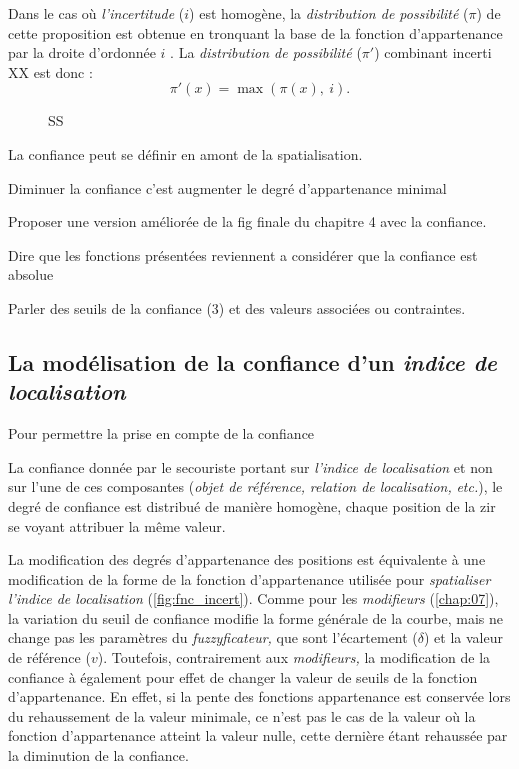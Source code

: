 Dans le cas où \emph{l'incertitude} (\(i\)) est homogène, la
\emph{distribution de possibilité} (\(π\)) de cette proposition est
obtenue en tronquant la base de la fonction d'appartenance par la
droite d'ordonnée \(i\) \autocite{Bouchon-Meunier2007}. La
\emph{distribution de possibilité} (\(π'\)) combinant incerti XX est
donc :
%
\begin{equation}
  π'(x) = \max(π(x),\ i).  
\end{equation}


\begin{figure}
  \centering
  
  \caption{SS}
  \label{fig:ss}
\end{figure}


La confiance peut se définir en amont de la spatialisation.

Diminuer la confiance c'est augmenter le degré d'appartenance minimal

Proposer une version améliorée de la fig finale du chapitre 4 avec la
confiance.

Dire que les fonctions présentées reviennent a considérer que la
confiance est absolue

Parler des seuils de la confiance (3) et des valeurs associées ou
contraintes.


\subsection{La modélisation de la confiance d'un \emph{indice de
    localisation}}

Pour permettre la prise en compte de la confiance


La confiance donnée par le secouriste portant sur \emph{l'indice de
  localisation} et non sur l'une de ces composantes (\eg \emph{objet
  de référence,} \emph{relation de localisation,} \emph{etc.}), le
degré de confiance est distribué de manière homogène, chaque position
de la \ac{zir} se voyant attribuer la même valeur.


La modification des degrés d'appartenance des positions est
équivalente à une modification de la forme de la fonction
d'appartenance utilisée pour \emph{spatialiser l'indice de
  localisation} (\autoref{fig:fnc_incert}). Comme pour les
\emph{modifieurs} (\autoref{chap:07}), la variation du seuil de
confiance modifie la forme générale de la courbe, mais ne change pas
les paramètres du \emph{fuzzyficateur,} que sont l'écartement
(\(\delta\)) et la valeur de référence (\(v\)). Toutefois,
contrairement aux \emph{modifieurs,} la modification de la confiance à
également pour effet de changer la valeur de seuils de la fonction
d'appartenance. En effet, si la pente des fonctions appartenance est
conservée lors du rehaussement de la valeur minimale, ce n'est pas le
cas de la valeur où la fonction d'appartenance atteint la valeur
nulle, cette dernière étant rehaussée par la diminution de la
confiance.

